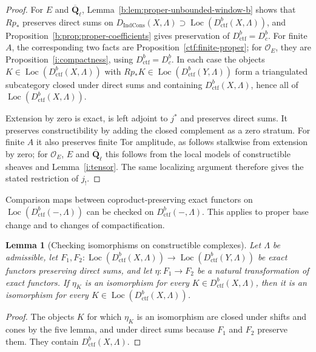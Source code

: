 \documentclass[11pt,a4paper]{article}
\numberwithin{equation}{section}
\newtheorem{lemma}[theorem]{Lemma}
\theoremstyle{definition}
\theoremstyle{remark}
\newcommand{\Dbc}{D^b_c}
\newcommand{\Loc}{\operatorname{Loc}}
\newcommand{\Qbar}{\overline{\mathbf Q}_\ell}
\newcommand{\IndCons}{\operatorname{IndCons}}
\newcommand{\Dic}{D_{\IndCons}}
\newcommand{\Dctf}{D^b_{\mathrm{ctf}}}
\begin{document}
\begin{proof}
For $E$ and $\Qbar$, Lemma~\ref{b:lem:proper-unbounded-window-b}
shows that $Rp_*$ preserves direct sums on
$\Dic(X,\Lambda)\supset\Loc(\Dctf(X,\Lambda))$, and
Proposition~\ref{b:prop:proper-coefficients} gives preservation of
$\Dctf=\Dbc$. For finite $A$, the corresponding two facts are
Proposition~\ref{ctf:finite-proper}; for $\mathcal O_E$, they are
Proposition~\ref{i:compactness}, using $\Dctf=\Dbc$. In each case the
objects $K\in\Loc(\Dctf(X,\Lambda))$ with
$Rp_*K\in\Loc(\Dctf(Y,\Lambda))$ form a triangulated subcategory closed
under direct sums and containing $\Dctf(X,\Lambda)$, hence all of
$\Loc(\Dctf(X,\Lambda))$.

Extension by zero is exact, is left adjoint to $j^*$ and preserves
direct sums. It preserves constructibility by adding the closed
complement as a zero stratum. For finite $A$ it also preserves finite
Tor amplitude, as follows stalkwise from extension by zero; for
$\mathcal O_E$, $E$ and $\Qbar$ this follows from the local models of
constructible sheaves and Lemma~\ref{i:tensor}. The same localizing argument therefore gives
the stated restriction of $j_!$.
\end{proof}

Comparison maps between coproduct-preserving exact functors on
$\Loc(\Dctf(-,\Lambda))$ can be checked on $\Dctf(-,\Lambda)$.
This applies to proper base change and to changes of compactification.

\begin{lemma}[Checking isomorphisms on constructible complexes]
\label{b:lem:localizing-comparison}
Let $\Lambda$ be admissible, let $F_1,F_2:\Loc(\Dctf(X,\Lambda))\to\Loc(\Dctf(Y,\Lambda))$ be exact functors
preserving direct sums, and let $\eta:F_1\to F_2$ be a natural
transformation of exact functors. If $\eta_K$ is an isomorphism for every
$K\in\Dctf(X,\Lambda)$, then it is an isomorphism for every
$K\in\Loc(\Dctf(X,\Lambda))$.
\end{lemma}

\begin{proof}
The objects $K$ for which $\eta_K$ is an isomorphism are closed under
shifts and cones by the five lemma, and under direct sums because $F_1$
and $F_2$ preserve them. They contain $\Dctf(X,\Lambda)$.
\end{proof}
\end{document}
